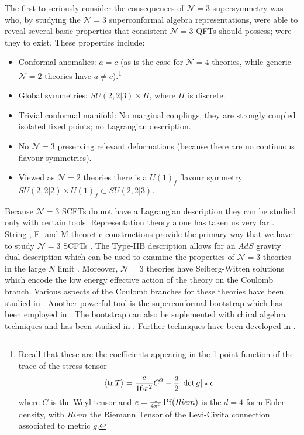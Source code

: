 \documentclass[main.tex]{subfiles}
\begin{document}
The first to seriously consider the consequences of $\mathcal{N} = 3$ supersymmetry was \cite{Aharony:2015oyb}
who, by studying the $\mathcal{N} = 3$ superconformal algebra representations, were able to reveal several basic properties that consistent $\mathcal{N}=3$ QFTs should possess; were they to exist. These properties include:
\begin{itemize}
\item Conformal anomalies: $a=c$ (as is the case for $\mathcal{N} = 4$ theories, while generic $\mathcal{N}=2$ theories have $a\neq c$).\footnote{Recall that these are the coefficients appearing in the 1-point function of the trace of the stress-tensor\begin{equation}
\langle \operatorname{tr} T\rangle=\frac{c}{16\pi^2}C^2-\frac{a}{2}|\det g|\star e
\end{equation}
where $C$ is the Weyl tensor and $e=\frac{1}{4\pi^2}\operatorname{Pf}(Riem)$ is the $d=4$-form Euler density, with $Riem$ the Riemann Tensor of the Levi-Civita connection associated to metric $g$.}
\item Global symmetries: $SU(2,2|3)\times H$, where $H$ is discrete.
\item Trivial conformal manifold: No marginal couplings, they are strongly coupled isolated fixed points; no Lagrangian description.
\item No $\mathcal{N}=3$ preserving relevant deformations (because there are no continuous flavour symmetries).
\item Viewed as $\mathcal{N}=2$ theories there is a $U(1)_f$ flavour symmetry $SU(2,2|2)\times U(1)_f\subset SU(2,2|3)$.
\end{itemize}

Because $\mathcal{N}=3$ SCFTs do not have a Lagrangian description they can be studied only with certain tools. Representation theory alone has taken us very far \cite{Aharony:2015oyb,Cordova:2016xhm,Evtikhiev:2017heo}.
String-, F- and M-theoretic constructions provide the primary way that we have to study $\mathcal{N}=3$ SCFTs \cite{Garcia-Etxebarria:2015wns,Garcia-Etxebarria:2016erx}. The Type-IIB description allows for an $AdS$ gravity dual description which can be used to examine the properties of $\mathcal{N}=3$ theories in the large $N$ limit \cite{Garcia-Etxebarria:2015wns,Aharony:2016kai,Imamura:2016abe}. Moreover, $\mathcal{N}=3$ theories have Seiberg-Witten solutions \cite{Seiberg:1994aj,Seiberg:1994rs} which encode the low energy effective action of the theory on the Coulomb branch. Various aspects of the Coulomb branches for these theories have been studied in \cite{Argyres:2015ffa,Argyres:2015gha,Argyres:2016xua,Argyres:2016xmc,Aharony:2016kai,Aharony:2015oyb,Argyres:2016yzz,Argyres:2018wxu}.
Another powerful tool is the superconformal bootstrap which has been employed in \cite{Lemos:2016xke}.
The bootstrap can also be suplemented with chiral algebra techniques \cite{Beem:2013sza} and has been studied in \cite{Nishinaka:2016hbw,Lemos:2016xke}. Further techniques have been developed in \cite{Imamura:2016udl,Agarwal:2016rvx}.
\end{document}
